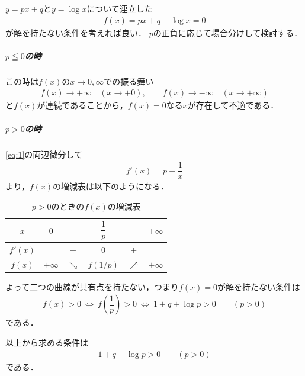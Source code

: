 \documentclass[../../main.tex]{subfiles}
\begin{document}
$y=px+q$と$y=\log x$について連立した
\begin{align}
  f(x)=px+q-\log x = 0 \label{eq:1}
\end{align}
が解を持たない条件を考えれば良い．
$p$の正負に応じて場合分けして検討する．

\subparagraph{$p\leqq0$の時}

この時は$f(x)$の$x\to0,\infty$での振る舞い
\begin{align}
  f(x)\longrightarrow+\infty\quad(x\to+0),\qquad
  f(x)\longrightarrow-\infty\quad(x\to+\infty)
\end{align}
と$f(x)$が連続であることから，$f(x)=0$なる$x$が存在して不適である．

\subparagraph{$p>0$の時}

\cref{eq:1}の両辺微分して
\begin{align}
  f'(x)=p-\dfrac{1}{x}
\end{align}
より，$f(x)$の増減表は以下のようになる．

\begin{table}[htb]
  \centering
  \caption{$p>0$のときの$f(x)$の増減表}
  \begin{tabular}{c|ccccc}
    $x$ & $0$ & & $\dfrac{1}{p}$ & & $+\infty$ \\
    \hline
    $f'(x)$ & & $-$ & $0$ & $+$ & \\
    \hline
    $f(x)$ & $+\infty$ & $\searrow$ & $f(1/p)$ & $\nearrow$ & $+\infty$
  \end{tabular}
\end{table}

よって二つの曲線が共有点を持たない，つまり$f(x)=0$が解を持たない条件は
\begin{align}
  f(x)>0\ \Longleftrightarrow\ f\left(\dfrac{1}{p}\right)>0
  \ \Longleftrightarrow\ 1+q+\log p>0\qquad(p>0)
\end{align}
である．
\casesend

以上から求める条件は
\begin{align}
  1+q+\log p>0\qquad(p>0)
\end{align}
である．
\end{document}
